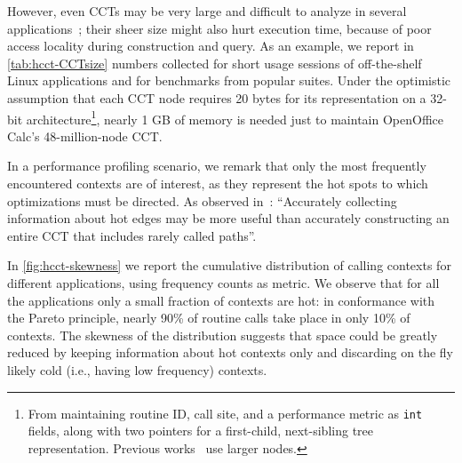 However, even CCTs may be very large and difficult to analyze in several applications~\cite{Bond07,Zhuang06}; their sheer size might also hurt execution time, because of poor access locality during construction and query. As an example, we report in \mytable\ref{tab:hcct-CCTsize} numbers collected for short usage sessions of off-the-shelf Linux applications and for benchmarks from popular suites. Under the optimistic assumption that each CCT node requires 20 bytes for its representation on a 32-bit architecture\footnote{From maintaining routine ID, call site, and a performance metric as {\tt int} fields, along with two pointers for a first-child, next-sibling tree representation. Previous works~\cite{Ammons97,Spivey04} use larger nodes.}, nearly 1 GB of memory is needed just to maintain OpenOffice Calc's 48-million-node CCT.


In a performance profiling scenario, we remark that only the most frequently encountered contexts are of interest, as they represent the hot spots to which optimizations must be directed. As observed in~\cite{Zhuang06}: ``Accurately collecting information about hot edges may be more useful than accurately constructing an entire CCT that includes rarely called paths''.

In \myfigure\ref{fig:hcct-skewness} we report the cumulative distribution of calling contexts for different applications, using frequency counts as metric. We observe that for all the applications only a small fraction of contexts are hot: in conformance with the Pareto principle, nearly 90\% of routine calls take place in only 10\% of contexts. The skewness of the distribution suggests that space could be greatly reduced by keeping information about hot contexts only and discarding on the fly likely cold (i.e., having low frequency) contexts.

